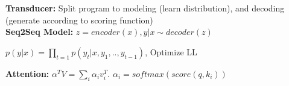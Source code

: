 \textbf{Transducer:} Split program to modeling (learn distribution), and decoding (generate according to scoring function)\\

\textbf{Seq2Seq Model:} $z = encoder(x), y|x \sim decoder(z)$\\
\begin{comment}
	We can use a WFST framework, Statistical machine translation or a neural machine translation for this. We are going for the neural machine translation (NMT).\\
	The problem is split up into Modeling a probability distribution (score function) and generating strings according to this scoring (decoding).\\
	Most neural architectures follow such an encoder-decoder structure.\\
	We start with an encoder, that maps a sentence to some representation z which is machine understandable. It is like a pre-processing step for the decoders.\\
\end{comment}  

$p(y|x) =\prod_{t=1} p(y_t| x, y_1,..,y_{t-1})$, Optimize LL\\
\begin{comment}
	To make our prediction of y at inference time, we generate $y_1$ according to $p(\cdot|x)$, $y_2$ according to $p(\cdot|x, y1)$, and so on.\\
	This behaves like a RNN, we put x into the encoder and decode $y_1,..,y_T$ iteratively by conditioning on the previous y's.\\
	\textbf{Limitation:} The main limitation is that the decoder only ever receives a single vector from the previous step, this is an information bottleneck.\\
\end{comment}



\textbf{Attention:} $\alpha^T V = \sum_i \alpha_i v_i^T$. $\alpha_i = softmax(score(q, k_i))$\\
\begin{comment}
	Assume $V \in \mathbb{R}^{n\times d}$ is the value table of a hash table and $\alpha \in \mathbb{R}^{n}$ is on-hot encoded indicating the position of the value. 
	The multiplication retrieves exactly one vector with the "hard" value. 
	If we use a continuous vector for alpha, we can "merge" together multiple entries of the value-table.
	We want a soft version, because it is differentiable, and thus can be used for backpropagation.\\
	\textbf{Framework:} We put in a query q and a key k, and score how similar they are. The alpha we get is then used to calculate the "soft" output over the values V.\\
	In general K=V is produced by the encoder. q is produced by the decoder. \\
\end{comment} 

